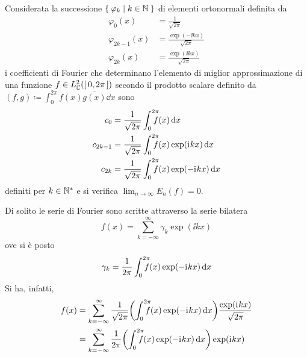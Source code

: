 	\begin{teorema}
		Considerata la successione \(\Set{\varphi_k | k \in \mathbb{N}}\) di elementi ortonormali definita da
		\begin{subequations}
			\begin{align}
				\varphi_0 (x)         & = \frac{1}{\sqrt{2 \pi}}                \\
				\varphi_{2 k - 1} (x) & = \frac{\exp (- \ii k x)}{\sqrt{2 \pi}} \\
				\varphi_{2 k} (x)     & = \frac{\exp (\ii k x)}{\sqrt{2 \pi}}
			\end{align}
		\end{subequations}
		i coefficienti di Fourier che determinano l'elemento di miglior approssimazione di una funzione \(f \in L_\mathbb{C}^2 ([\, 0, 2 \pi \,])\) secondo il prodotto scalare definito da \((f, g) \coloneqq \int_0^{2 \pi} f (x) \overline{g (x)} \dd{x}\) sono
		\begin{subequations}
			\begin{align}
				c_0         & = \frac{1}{\sqrt{2 \pi}} \int_0^{\mathrlap{2 \pi}} f (x) \dd{x}                  \\
				c_{2 k - 1} & = \frac{1}{\sqrt{2 \pi}} \int_0^{\mathrlap{2 \pi}} f (x) \exp (\ii k x) \dd{x}   \\
				c_{2 k}     & = \frac{1}{\sqrt{2 \pi}} \int_0^{\mathrlap{2 \pi}} f (x) \exp (- \ii k x) \dd{x}
			\end{align}
		\end{subequations}
		definiti per \(k \in \mathbb{N}^*\) e si verifica \(\lim_{n \to \infty} E_n (f) = 0\).
	\end{teorema}

	Di solito le serie di Fourier sono scritte attraverso la serie bilatera
	\begin{equation*}
		f (x) = \sum_{k = - \infty}^\infty \gamma_k \exp (\ii k x)
	\end{equation*}
	ove si è posto
	\begin{equation}\label{eq:coeff-fourier-complessi}
		\gamma_k = \frac{1}{2 \pi} \int_0^{\mathrlap{2 \pi}} f (x) \exp (- \ii k x) \dd{x}
	\end{equation}
	Si ha, infatti,
	\begin{equation}\label{eq:fourier-formula-complessa}
		\begin{split}
			f (x) &= \sum_{k = - \infty}^\infty \frac{1}{\sqrt{2 \pi}} \qty(\int_0^{\mathrlap{2 \pi}} f (x) \exp (- \ii k x) \dd{x}) \frac{\exp (\ii k x)}{\sqrt{2 \pi}} \\
			&= \sum_{k = - \infty}^\infty \frac{1}{2 \pi} \qty(\int_0^{\mathrlap{2 \pi}} f (x) \exp (- \ii k x) \dd{x}) \exp (\ii k x)
		\end{split}
	\end{equation}

